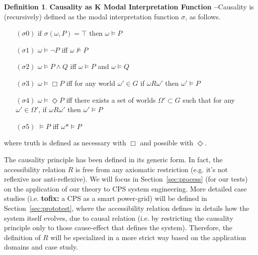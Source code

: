 \documentclass{article}
\newcommand{\fix}[2]{{\color{red} {\bf tofix:} #2}}
\theoremstyle{definition}
\newtheorem{definition}{Definition}[section]
\theoremstyle{corollary}
\theoremstyle{lemma}
\theoremstyle{theorem}
\theoremstyle{theorem}
\newcommand{\possibleworlds}{G}
\newcommand{\modalrelation}{R}
\newcommand{\actualworld}{\omega*}
\newcommand{\world}{\omega}
\newcommand{\World}{\Omega}
\newcommand{\interpretation}{\sigma}
\begin{document}
\begin{definition}{\bf Causality as K Modal Interpretation Function --}\label{def:modalinterpretation}
	Causality is (recursively) defined as the modal interpretation function $\interpretation$, as follows. 
	\begin{enumerate}[noitemsep]
		\item[$(\interpretation0)$] if $\interpretation(\world,P)=\top$ then $\world\models P$
		\item[$(\interpretation1)$] $\world\models\neg P$ iff $\world\not\models P$
		\item[$(\interpretation2)$] $\world\models P \wedge Q$ iff $\world\models P$ and $\world\models Q$
		\item[$(\interpretation3)$] $\world\models\Box P$ iff for any world $\world'\in\possibleworlds$ if $\world \modalrelation\world'$ then $\world'\models P$
		\item[$(\interpretation4)$] $\world\models\Diamond P$ iff there exists a set of worlds $\World'\subset\possibleworlds$ such that for any $\world'\in\World'$, if $\world\modalrelation\world'$ then $\world'\models P$
		\item[$(\interpretation5)$] $\models P$ iff $\actualworld\models P$
	\end{enumerate}
	where truth is defined as necessary with $\Box$ and possible with $\Diamond$.
\end{definition}


The causality principle has been defined in its
generic form. In fact, the accessibility relation $\modalrelation$ is free from
any axiomatic restriction (e.g. it's not reflexive nor anti-reflexive).  
We will focus in Section~\ref{sec:process} (for our tests) on 
the application of our theory to CPS system engineering.
More detailed case studies (i.e. \fix{mr}{a CPS as a smart power-grid}) 
will be defined in Section~\ref{sec:prototest}, where
the accessibility relation defines in details how the system itself evolves, due to causal relation 
(i.e. by restricting the causality principle only to those cause-effect that defines
the system). Therefore, the definition of $\modalrelation$
will be specialized in a more strict way based on the application domains and case study.
\end{document}
